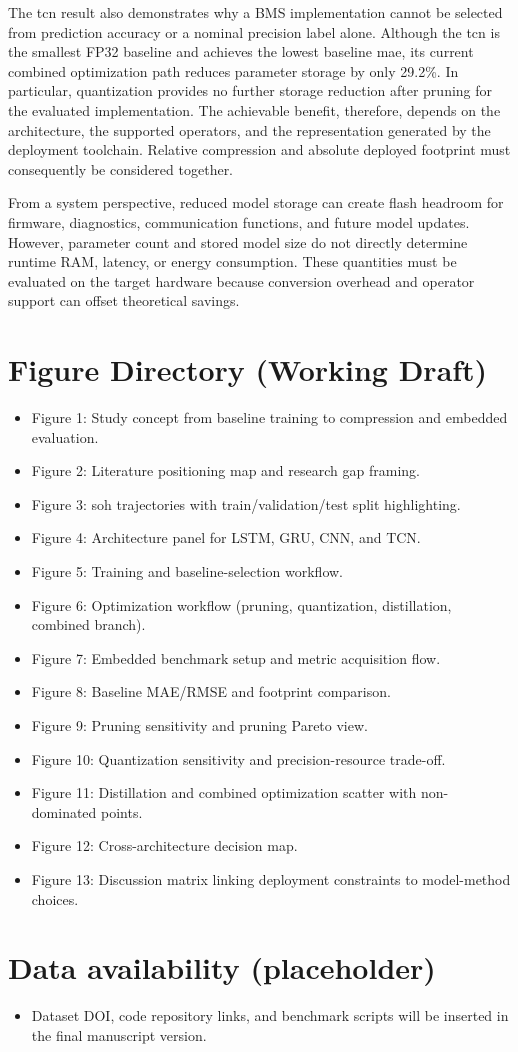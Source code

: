 \documentclass[final,3p,times]{elsarticle}
\begin{document}
The \ac{tcn} result also demonstrates why a BMS implementation cannot be selected from prediction accuracy or a nominal precision label alone. Although the \ac{tcn} is the smallest FP32 baseline and achieves the lowest baseline \ac{mae}, its current combined optimization path reduces parameter storage by only 29.2\%. In particular, quantization provides no further storage reduction after pruning for the evaluated implementation. The achievable benefit, therefore, depends on the architecture, the supported operators, and the representation generated by the deployment toolchain. Relative compression and absolute deployed footprint must consequently be considered together.

From a system perspective, reduced model storage can create flash headroom for firmware, diagnostics, communication functions, and future model updates. However, parameter count and stored model size do not directly determine runtime RAM, latency, or energy consumption. These quantities must be evaluated on the target hardware because conversion overhead and operator support can offset theoretical savings. 

\section*{Figure Directory (Working Draft)}
\begin{itemize}[leftmargin=*]
\item Figure 1: Study concept from baseline training to compression and embedded evaluation.
\item Figure 2: Literature positioning map and research gap framing.
\item Figure 3: \ac{soh} trajectories with train/validation/test split highlighting.
\item Figure 4: Architecture panel for LSTM, GRU, CNN, and TCN.
\item Figure 5: Training and baseline-selection workflow.
\item Figure 6: Optimization workflow (pruning, quantization, distillation, combined branch).
\item Figure 7: Embedded benchmark setup and metric acquisition flow.
\item Figure 8: Baseline MAE/RMSE and footprint comparison.
\item Figure 9: Pruning sensitivity and pruning Pareto view.
\item Figure 10: Quantization sensitivity and precision-resource trade-off.
\item Figure 11: Distillation and combined optimization scatter with non-dominated points.
\item Figure 12: Cross-architecture decision map.
\item Figure 13: Discussion matrix linking deployment constraints to model-method choices.
\end{itemize}

\section*{Data availability (placeholder)}
\begin{itemize}[leftmargin=*]
\item Dataset DOI, code repository links, and benchmark scripts will be inserted in the final manuscript version.
\end{itemize}



%
\end{document}
